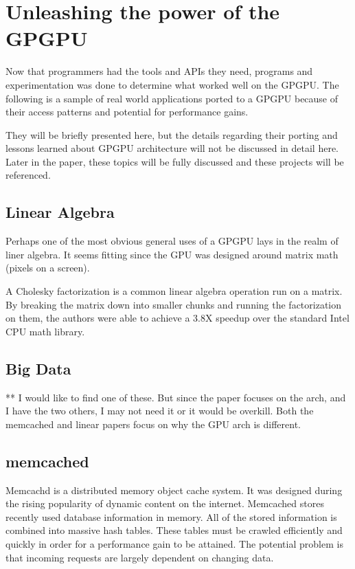 \section*{Unleashing the power of the GPGPU}


Now that programmers had the tools and APIs they need, programs and experimentation was done to determine what worked well on the GPGPU. The following is a sample of real world applications ported to a GPGPU because of their access patterns and potential for performance gains. 

They will be briefly presented here, but the details regarding their porting and lessons learned about GPGPU architecture will not be discussed in detail here. Later in the paper, these topics will be fully discussed and these projects will be referenced. 

\subsection*{Linear Algebra}

Perhaps one of the most obvious general uses of a GPGPU lays in the realm of liner algebra. It seems fitting since the GPU was designed around matrix math (pixels on a screen). 

A Cholesky factorization is a common linear algebra operation run on a matrix. By breaking the matrix down into smaller chunks and running the factorization on them, the authors were able to achieve a 3.8X speedup over the standard Intel CPU math library. \cite{linearalg}

\subsection*{Big Data}

** I would like to find one of these. But since the paper focuses on the arch, and I have the two others, I may not need it or it would be overkill. Both the memcached and linear papers focus on why the GPU arch is different. 

\subsection*{memcached}


Memcachd is a distributed memory object cache system. It was designed during the rising popularity of dynamic content on the internet. Memcached stores recently used database information in memory. All of the stored information is combined into massive hash tables. These tables must be crawled efficiently and quickly in order for a performance gain to be attained. The potential problem is that incoming requests are largely dependent on changing data. 

